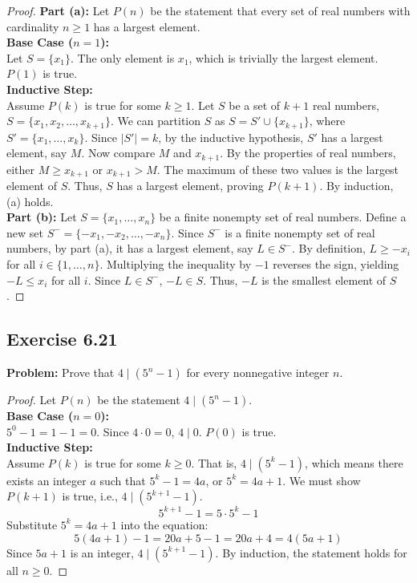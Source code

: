 \documentclass[11pt, a4paper]{article}
\theoremstyle{definition}
\theoremstyle{remark}
\begin{document}
\begin{proof}
\textbf{Part (a):} Let $P(n)$ be the statement that every set of real numbers with cardinality $n \ge 1$ has a largest element.
\vspace{4pt} \\
\textbf{Base Case ($n = 1$):} \\
Let $S = \{x_1\}$. The only element is $x_1$, which is trivially the largest element. $P(1)$ is true.
\vspace{4pt} \\
\textbf{Inductive Step:} \\
Assume $P(k)$ is true for some $k \ge 1$. Let $S$ be a set of $k+1$ real numbers, $S = \{x_1, x_2, \dots, x_{k+1}\}$. We can partition $S$ as $S = S' \cup \{x_{k+1}\}$, where $S' = \{x_1, \dots, x_k\}$. 
Since $|S'| = k$, by the inductive hypothesis, $S'$ has a largest element, say $M$. 
Now compare $M$ and $x_{k+1}$. By the properties of real numbers, either $M \ge x_{k+1}$ or $x_{k+1} > M$. The maximum of these two values is the largest element of $S$. Thus, $S$ has a largest element, proving $P(k+1)$. By induction, (a) holds.
\vspace{4pt} \\
\textbf{Part (b):} Let $S = \{x_1, \dots, x_n\}$ be a finite nonempty set of real numbers. Define a new set $S^- = \{-x_1, -x_2, \dots, -x_n\}$. Since $S^-$ is a finite nonempty set of real numbers, by part (a), it has a largest element, say $L \in S^-$. 
By definition, $L \ge -x_i$ for all $i \in \{1, \dots, n\}$. Multiplying the inequality by $-1$ reverses the sign, yielding $-L \le x_i$ for all $i$. Since $L \in S^-$, $-L \in S$. Thus, $-L$ is the smallest element of $S$.
\end{proof}

\subsection{Exercise 6.21}
\textbf{Problem:} Prove that $4 \mid (5^n - 1)$ for every nonnegative integer $n$.

\begin{proof}
Let $P(n)$ be the statement $4 \mid (5^n - 1)$.
\vspace{4pt} \\
\textbf{Base Case ($n = 0$):} \\
$5^0 - 1 = 1 - 1 = 0$. Since $4 \cdot 0 = 0$, $4 \mid 0$. $P(0)$ is true.
\vspace{4pt} \\
\textbf{Inductive Step:} \\
Assume $P(k)$ is true for some $k \ge 0$. That is, $4 \mid (5^k - 1)$, which means there exists an integer $a$ such that $5^k - 1 = 4a$, or $5^k = 4a + 1$.
We must show $P(k+1)$ is true, i.e., $4 \mid (5^{k+1} - 1)$.
\[ 5^{k+1} - 1 = 5 \cdot 5^k - 1 \]
Substitute $5^k = 4a + 1$ into the equation:
\[ 5(4a + 1) - 1 = 20a + 5 - 1 = 20a + 4 = 4(5a + 1) \]
Since $5a + 1$ is an integer, $4 \mid (5^{k+1} - 1)$. By induction, the statement holds for all $n \ge 0$.
\end{proof}
\end{document}
